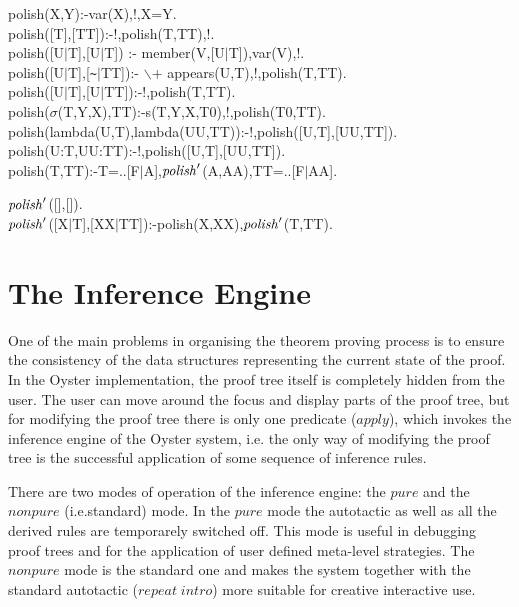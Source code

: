 \documentclass[11pt]{report}
\makeatletter
\newcommand{\ulinv}[1]{\index{#1@\texttt{#1}}}
\makeatother
\begin{document}
 \ulinv{polish}
\begin{sf}\begin{tabbing}
polish(X,Y):-var(X),!,X=Y.\\[-0.15ex]
polish([T],[TT]):-!,polish(T,TT),!.\\[-0.15ex]
polish([U$\mid$T],[U$\mid$T]) :- member(V,[U$\mid$T]),var(V),!.\\[-0.15ex]
polish([U$\mid$T],[{\verb`~`}$\mid$TT]):- $\backslash$+ appears(U,T),!,polish(T,TT).\\[-0.15ex]
polish([U$\mid$T],[U$\mid$TT]):-!,polish(T,TT).\\[-0.15ex]
polish($\sigma$(T,Y,X),TT):-s(T,Y,X,T0),!,polish(T0,TT).\\[-0.15ex]
polish(lambda(U,T),lambda(UU,TT)):-!,polish([U,T],[UU,TT]).\\[-0.15ex]
polish(U:T,UU:TT):-!,polish([U,T],[UU,TT]).\\[-0.15ex]
polish(T,TT):-T=..[F$\mid$A],${\it polish}'$(A,AA),TT=..[F$\mid$AA].\\[-0.7ex]

\end{tabbing}\end{sf}

 \ulinv{polishl}
\begin{sf}\begin{tabbing}
${\it polish}'$([],[]).\\[-0.15ex]
${\it polish}'$([X$\mid$T],[XX$\mid$TT]):-polish(X,XX),${\it polish}'$(T,TT).
\end{tabbing}\end{sf}

 \normalsize
  
 \section{The Inference Engine}
 
 One of the main problems in organising the theorem proving process
 is to ensure the consistency of the data structures representing
 the current state of the proof. In the Oyster implementation, the
 proof tree itself is completely hidden from the user. The user can
 move around the focus and display parts of the proof tree, but 
 for modifying the proof tree there is only one predicate ($apply$),
 which invokes the inference engine of the Oyster system, i.e. the only
 way of modifying the proof tree is the successful application of
 some sequence of inference rules. 
 
 There are two modes of operation of the inference engine:
 the $pure$ and the $nonpure$ (i.e.standard) mode. In the
 $pure$ mode the autotactic as well as all the derived  
 rules are temporarely switched off. This mode is useful in
 debugging proof trees and for the application of
 user defined meta-level strategies.
 The $nonpure$ mode is the standard one and makes the system
 together with the standard autotactic ($repeat \; intro$)
 more suitable for creative interactive use.
 
\end{document}
